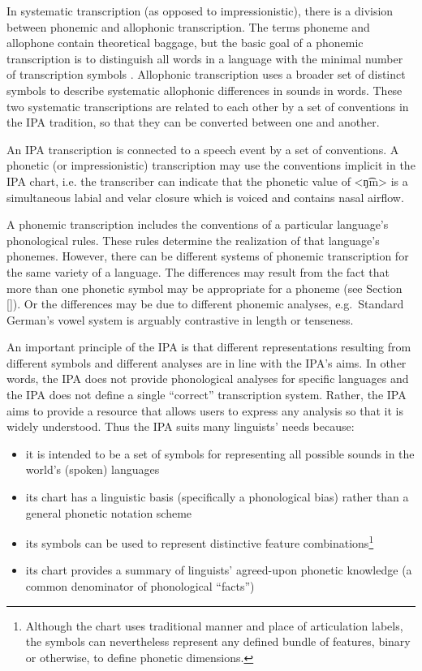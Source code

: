 In systematic transcription (as opposed to impressionistic), there is a division 
between phonemic and allophonic transcription. The terms phoneme and allophone 
contain theoretical baggage, but the basic goal of a phonemic transcription is to 
distinguish all words in a language with the minimal number of transcription 
symbols \citep[19]{Abercrombie1964}. Allophonic transcription uses a broader 
set of distinct symbols to describe systematic allophonic differences in sounds 
in words. These two systematic transcriptions are related to each other by a 
set of conventions in the IPA tradition, so that they can be converted between 
one and another.

An IPA transcription is connected to a speech event by a set of conventions. 
A phonetic (or impressionistic) transcription may use the conventions implicit 
in the IPA chart, i.e. the transcriber can indicate that the phonetic value of 
<ŋ͡m> is a simultaneous labial and velar closure which is voiced and contains 
nasal airflow. 

A phonemic transcription includes the conventions of a particular language's 
phonological rules. These rules determine the realization of that language's 
phonemes. However, there can be different systems of phonemic transcription 
for the same variety of a language. The differences may result from the fact 
that more than one phonetic symbol may be appropriate for a phoneme (see Section 
\ref{}). Or the differences may be due to different phonemic analyses, e.g.\ 
Standard German's vowel system is arguably contrastive in length or tenseness.

An important principle of the IPA is that different representations resulting 
from different symbols and different analyses are in line with the IPA's aims. 
In other words, the IPA does not provide phonological analyses for specific 
languages and the IPA does not define a single ``correct'' transcription system. 
Rather, the IPA aims to provide a resource that allows users to express any 
analysis so that it is widely understood. Thus the IPA suits many linguists' 
needs because:

\begin{itemize}
	\item it is intended to be a set of symbols for representing all possible sounds in the world's (spoken) languages
	\item its chart has a linguistic basis (specifically a phonological bias) rather than a general phonetic notation scheme
	\item its symbols can be used to represent distinctive feature combinations\footnote{Although the chart uses traditional manner and place of articulation labels, the symbols can nevertheless represent any defined bundle of features, binary or otherwise, to define phonetic dimensions.}
	\item its chart provides a summary of linguists' agreed-upon phonetic knowledge (a common denominator of phonological ``facts'')
\end{itemize}

